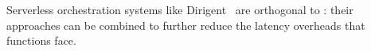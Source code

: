 Serverless orchestration systems like Dirigent~\cite{dirigent} are orthogonal to
\sys{}: their approaches can be combined to further reduce the latency overheads
that functions face.


